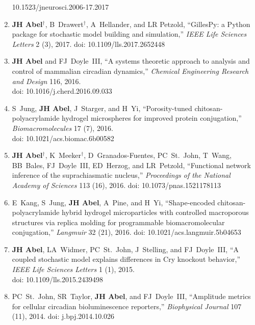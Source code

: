 \documentclass[line,10pt]{res}
\begin{document}
\begin{resume}
\begin{enumerate}
    10.1523/jneurosci.2006-17.2017%
    \item \textbf{JH Abel}$^\dagger$, B~Drawert$^\dagger$, A~Hellander, and LR Petzold, ``GillesPy: a Python package for stochastic model building and simulation,'' \textit{IEEE Life Sciences Letters} 2 (3), 2017. doi: %
    10.1109/lls.2017.2652448%
    \item \textbf{JH Abel} and FJ~Doyle~III, ``A systems theoretic approach to analysis and control of mammalian circadian dynamics,'' \textit{Chemical Engineering Research and Design} 116, 2016. \\doi: %
    10.1016/j.cherd.2016.09.033%
    \item S~Jung, \textbf{JH Abel}, J~Starger, and H~Yi, ``Porosity-tuned chitosan-polyacrylamide hydrogel microspheres for improved protein conjugation,'' \textit{Biomacromolecules} 17 (7), 2016. \\doi:%
    10.1021/acs.biomac.6b00582%
    \item \textbf{JH Abel}$^\dagger$, K~Meeker$^\dagger$, D~Granados-Fuentes, PC~St.~John, T~Wang, BB~Bales, FJ~Doyle~III, ED~Herzog, and LR~Petzold,
        ``Functional network inference of the suprachiasmatic nucleus,''  \textit{Proceedings of the National Academy of Sciences} 113 (16), 2016. doi:  %
10.1073/pnas.1521178113%
    \item E~Kang, S~Jung, \textbf{JH Abel}, A~Pine, and H~Yi, ``Shape-encoded chitosan-polyacrylamide hybrid hydrogel microparticles with controlled macroporous structures via replica molding for programmable biomacromolecular conjugation,'' \textit{Langmuir} 32 (21), 2016. doi: %
    10.1021/acs.langmuir.5b04653%
    \item \textbf{JH Abel}, LA~Widmer, PC~St.~John, J~Stelling, and FJ~Doyle~III,
        ``A coupled stochastic model explains differences in Cry knockout behavior,'' \textit{IEEE Life Sciences Letters} 1 (1), 2015. \\doi: %
10.1109/lls.2015.2439498%
    \item PC~St.~John, SR~Taylor, \textbf{JH Abel}, and FJ~Doyle~III, ``Amplitude metrics for cellular circadian bioluminescence reporters,'' \textit{Biophysical Journal} 107 (11), 2014. doi: %
    j.bpj.2014.10.026%
\end{enumerate}


\end{resume}
\end{document}
